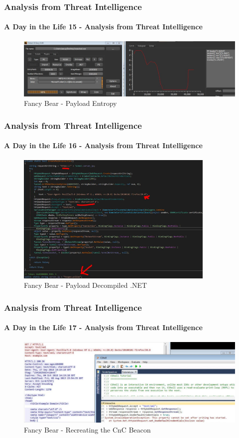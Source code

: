 \documentclass[aspectratio=169]{beamer}
\begin{document}
\begin{frame}
  \frametitle{Analysis from Threat Intelligence}
  \framesubtitle{A Day in the Life 15 - Analysis from Threat Intelligence}
  \begin{center}
    \begin{figure}
      \includegraphics[width=14cm,keepaspectratio]{fancy_bear_analysis_6}
      \caption{Fancy Bear - Payload Entropy}
    \end{figure}
  \end{center}
\end{frame}

\begin{frame}
  \frametitle{Analysis from Threat Intelligence}
  \framesubtitle{A Day in the Life 16 - Analysis from Threat Intelligence}
  \begin{center}
    \begin{figure}
      \includegraphics[width=9.5cm,keepaspectratio]{fancy_bear_analysis_7}
      \caption{Fancy Bear - Payload Decompiled .NET}
    \end{figure}
  \end{center}
\end{frame}

\begin{frame}
  \frametitle{Analysis from Threat Intelligence}
  \framesubtitle{A Day in the Life 17 - Analysis from Threat Intelligence}
  \begin{center}
    \begin{figure}
      \includegraphics[width=14cm,keepaspectratio]{fancy_bear_analysis_8}
      \caption{Fancy Bear - Recreating the CnC Beacon}
    \end{figure}
  \end{center}
\end{frame}
\end{document}
